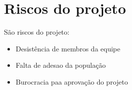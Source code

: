 \section{Riscos do projeto}

  São riscos do projeto:

  \begin{itemize}
    \item Desistência de membros da equipe
    \item Falta de adesao da população
    \item Burocracia paa aprovação do projeto
  \end{itemize}
